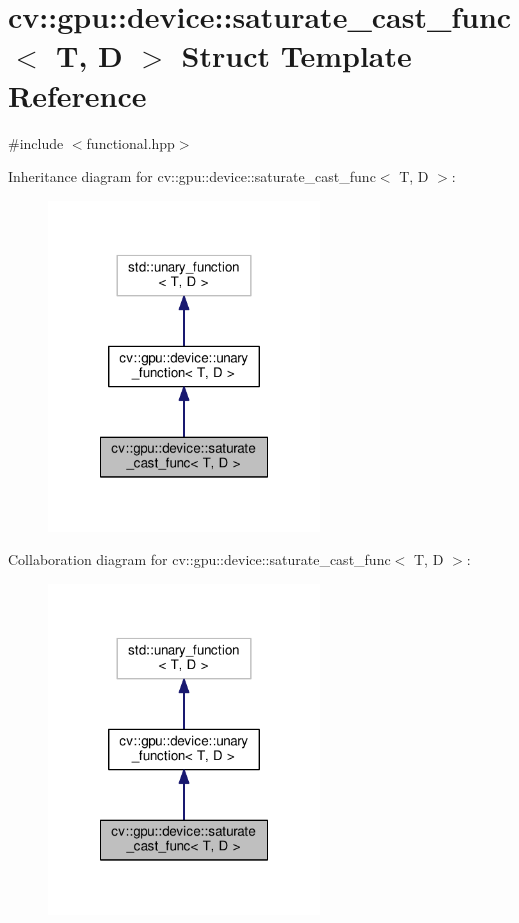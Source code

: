 \hypertarget{structcv_1_1gpu_1_1device_1_1saturate__cast__func}{\section{cv\-:\-:gpu\-:\-:device\-:\-:saturate\-\_\-cast\-\_\-func$<$ T, D $>$ Struct Template Reference}
\label{structcv_1_1gpu_1_1device_1_1saturate__cast__func}
}


{\ttfamily \#include $<$functional.\-hpp$>$}



Inheritance diagram for cv\-:\-:gpu\-:\-:device\-:\-:saturate\-\_\-cast\-\_\-func$<$ T, D $>$\-:\nopagebreak
\begin{figure}[H]
\begin{center}
\leavevmode
\includegraphics[width=204pt]{structcv_1_1gpu_1_1device_1_1saturate__cast__func__inherit__graph}
\end{center}
\end{figure}


Collaboration diagram for cv\-:\-:gpu\-:\-:device\-:\-:saturate\-\_\-cast\-\_\-func$<$ T, D $>$\-:\nopagebreak
\begin{figure}[H]
\begin{center}
\leavevmode
\includegraphics[width=204pt]{structcv_1_1gpu_1_1device_1_1saturate__cast__func__coll__graph}
\end{center}
\end{figure}
